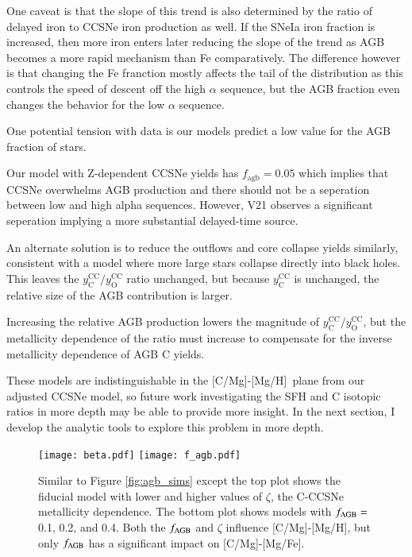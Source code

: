 \documentclass[12pt,oneside]{report}
\newcommand{\caah}{[C/Mg]-[Mg/H]}
\newcommand{\caafe}{[C/Mg]-[Mg/Fe]}
\begin{document}
One caveat is that the slope of this trend is also determined by the ratio of delayed iron to CCSNe iron production as well. If the SNeIa iron fraction is increased, then more iron enters later reducing the slope of the trend as AGB becomes a more rapid mechanism than Fe comparatively. The difference however is that changing the Fe franction mostly affects the tail of the distribution as this controls the speed of descent off the high $\alpha$ sequence, but the AGB fraction even changes the behavior for the low $\alpha$ sequence.

One potential tension with data is our models predict a low value for the AGB fraction of stars. 

Our model with Z-dependent CCSNe yields has $f_\text{agb} = 0.05$ which implies that CCSNe overwhelms AGB production and there should not be a seperation between low and high alpha sequences. However, V21 observes a significant seperation implying a more substantial delayed-time source. 

An alternate solution is to reduce the outflows and core collapse yields similarly, consistent with a model where more large stars collapse directly into black holes. This leaves the $y_\text{C}^\text{CC}/y_\text{O}^\text{CC}$ ratio unchanged, but because $y_\text{C}^\text{CC}$ is unchanged, the relative size of the AGB contribution is larger. 


Increasing the relative AGB production lowers the magnitude of  $y_\text{C}^\text{CC}/y_\text{O}^\text{CC}$, but the metallicity dependence of the ratio must increase to compensate for the inverse metallicity dependence of AGB C yields. 

These models are indistinguishable in the \caah~plane from our adjusted CCSNe model, so future work investigating the SFH and C isotopic ratios in more depth may be able to provide more insight. In the next section, I develop the analytic tools to explore this problem in more depth. 


\begin{figure}
\centering
\texttt{[image: beta.pdf]}
\texttt{[image: f\_agb.pdf]}

\caption[Adjusted yield models]{Similar to Figure \ref{fig:agb_sims} except the top plot shows the fiducial model with lower and higher values of $\zeta$, the C-CCSNe metallicity dependence. The bottom plot shows models with $f_{\rm AGB}=$0.1, 0.2, and 0.4. Both the $f_{\rm AGB}$ and $\zeta$ influence \caah, but only $f_{\rm AGB}$ has a significant impact on \caafe.}
\label{fig:beta_f}
\end{figure}
\end{document}
